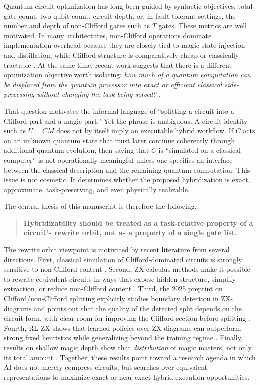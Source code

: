 \documentclass[11pt]{article}
\theoremstyle{remark}
\begin{document}
Quantum circuit optimization has long been guided by syntactic objectives: total gate count, two-qubit count, circuit depth, or, in fault-tolerant settings, the number and depth of non-Clifford gates such as $T$ gates. These metrics are well motivated. In many architectures, non-Clifford operations dominate implementation overhead because they are closely tied to magic-state injection and distillation, while Clifford structure is comparatively cheap or classically tractable \cite{bravyi_gosset_2016, howard_campbell_2017, alphatensor_2025}. At the same time, recent work suggests that there is a different optimization objective worth isolating: \emph{how much of a quantum computation can be displaced from the quantum processor into exact or efficient classical side-processing without changing the task being solved?} \cite{peres_galvao_2023, splitting_2025}.

That question motivates the informal language of ``splitting a circuit into a Clifford part and a magic part.'' Yet the phrase is ambiguous. A circuit identity such as $U = C M$ does not by itself imply an executable hybrid workflow. If $C$ acts on an unknown quantum state that must later continue coherently through additional quantum evolution, then saying that $C$ is ``simulated on a classical computer'' is not operationally meaningful unless one specifies an interface between the classical description and the remaining quantum computation. This issue is not cosmetic. It determines whether the proposed hybridization is exact, approximate, task-preserving, and even physically realizable.

The central thesis of this manuscript is therefore the following.

\begin{quote}
\textbf{Hybridizability should be treated as a task-relative property of a circuit's rewrite orbit, not as a property of a single gate list.}
\end{quote}

The rewrite orbit viewpoint is motivated by recent literature from several directions. First, classical simulation of Clifford-dominated circuits is strongly sensitive to non-Clifford content \cite{bravyi_gosset_2016}. Second, ZX-calculus methods make it possible to rewrite equivalent circuits in ways that expose hidden structure, simplify extraction, or reduce non-Clifford content \cite{duncan_et_al_2020, kissinger_vdw_2020, pyzx_2020}. Third, the 2025 preprint on Clifford/non-Clifford splitting explicitly studies boundary detection in ZX-diagrams and points out that the quality of the detected split depends on the circuit form, with clear room for improving the Clifford section before splitting \cite{splitting_2025}. Fourth, RL-ZX shows that learned policies over ZX-diagrams can outperform strong fixed heuristics while generalizing beyond the training regime \cite{rlzx_2025}. Finally, results on shallow magic depth show that \emph{distribution} of magic matters, not only its total amount \cite{shallow_magic_2025}. Together, these results point toward a research agenda in which AI does not merely compress circuits, but searches over equivalent representations to maximize exact or near-exact hybrid execution opportunities.
\end{document}
